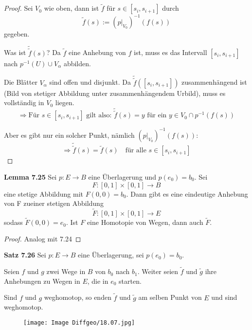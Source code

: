 \documentclass[fleqn, 12pt, letterpaper]{article}
\begin{document}
\begin{proof}
Sei \( V_0 \) wie oben, dann ist \( \tilde{f} \) für \( s \in [s_i, s_{i+1}] \) durch
\[
\tilde{f}(s) := (p|_{V_0})^{-1}(f(s))
\]
gegeben.

Was ist \( \tilde{\tilde{f}}(s) \)? Da \( \tilde{f} \) eine Anhebung von \( f \) ist, muss es das Intervall \( [s_i, s_{i+1}] \) nach \( p^{-1}(U)\cup V_\alpha\) abbilden. 

Die Blätter \( V_\alpha \) sind offen und disjunkt. Da \( \tilde{\tilde{f}}([s_i, s_{i+1}]) \) zusammenhängend ist (Bild von stetiger Abbildung unter zusammenhängendem Urbild), muss es vollständig in $V_0$ liegen.
\[
\Rightarrow \text{Für } s \in [s_i, s_{i+1}] \text{ gilt also: } \tilde{\tilde{f}}(s) =y \text{ für ein }y\in V_0 \cap p^{-1}(f(s))
\]

Aber es gibt nur ein solcher Punkt, nämlich $(p|_{V_0})^{-1}(f(s))$:
\[
\Rightarrow \tilde{\tilde{f}}(s) = \tilde{f}(s) \quad \text{für alle } s \in [s_i, s_{i+1}]
\]

\end{proof}

\textbf{Lemma 7.25}
Sei \( p : E \to B \) eine Überlagerung und \( p(e_0) = b_0 \). Sei 
\[ 
F : [0,1] \times [0,1] \to B 
\]
eine stetige Abbildung mit \( F(0,0) = b_0 \). Dann gibt es eine eindeutige Anhebung von F zueiner stetigen Abbildung
\[ 
\widetilde{F} : [0,1] \times [0,1] \to E 
\]
sodass \( \widetilde{F}(0,0) = e_0 \). Ist \( F \) eine Homotopie von Wegen, dann auch \( \widetilde{F} \).
\begin{proof}
    Analog mit 7.24
\end{proof}

\vspace{1em}

\textbf{Satz 7.26}
Sei \( p : E \to B \) eine Überlagerung, sei \( p(e_0) = b_0 \). 

Seien \( f \) und \( g \) zwei Wege in \( B \) von \( b_0 \) nach \( b_1 \). Weiter seien \( \widetilde{f} \) und \( \widetilde{g} \) ihre Anhebungen zu Wegen in \( E \), die in \( e_0 \) starten. 

Sind \( f \) und \( g \) weghomotop, so enden \( \widetilde{f} \) und \( \widetilde{g} \) am selben Punkt von \( E \) und sind weghomotop.

 \begin{figure}[H]
    \centering
    \texttt{[image: Image Diffgeo/18.07.jpg]}
 \end{figure}
 
\end{document}

